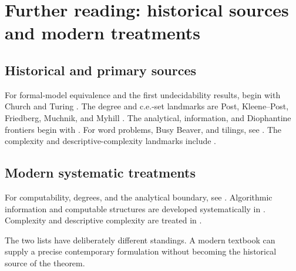 \section{Further reading: historical sources and modern treatments}
\label{sec:p04-further-reading}

\subsection*{Historical and primary sources}

For formal-model equivalence and the first undecidability results, begin with
Church and Turing \cite{Church1936,Turing1937,Turing1937Lambda}.  The degree
and c.e.-set landmarks are Post, Kleene--Post, Friedberg, Muchnik, and Myhill
\cite{Post1944,KleenePost1954,Friedberg1957,Muchnik1956,Myhill1955}.
The analytical, information, and Diophantine frontiers begin with
\cite{Kleene1955Hierarchy,Kolmogorov1965,Chaitin1974,Chaitin1975,
DavisPutnamRobinson1961,Matiyasevich1970}.  For word problems, Busy Beaver,
and tilings, see \cite{Post1947,Markov1947,Novikov1955,Boone1959,
Rado1962BusyBeaver,Berger1966}.  The complexity and descriptive-complexity
landmarks include \cite{HartmanisStearns1965,StearnsHartmanisLewis1965,
Cook1971,Levin1973,StockmeyerMeyer1973,Fagin1974,Immerman1986}.

\subsection*{Modern systematic treatments}

For computability, degrees, and the analytical boundary, see
\cite{Rogers1967,Soare2016,Moschovakis2016Hyperarithmetical}.  Algorithmic
information and computable structures are developed systematically in
\cite{LiVitanyi2008,AshKnight2000}.  Complexity and descriptive complexity
are treated in \cite{Papadimitriou1994,AroraBarak2009,Immerman1999}.

The two lists have deliberately different standings.  A modern textbook can
supply a precise contemporary formulation without becoming the historical
source of the theorem.

